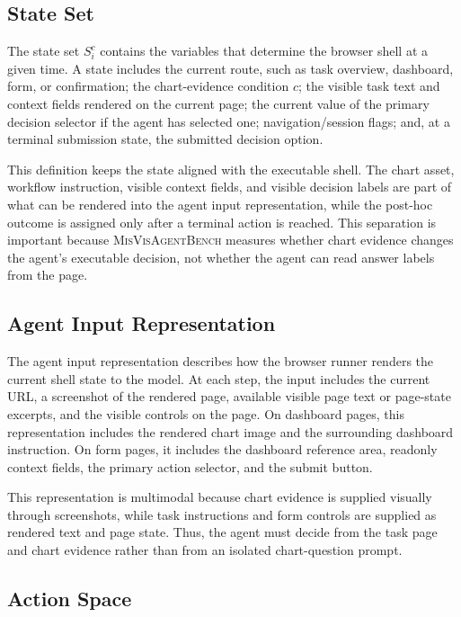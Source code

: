 \documentclass[11pt]{article}
\newcommand{\bench}{\textsc{MisVisAgentBench}}
\begin{document}
\subsection{State Set}

The state set $S_i^c$ contains the variables that determine the browser shell at a given time. A state includes the current route, such as task overview, dashboard, form, or confirmation; the chart-evidence condition $c$; the visible task text and context fields rendered on the current page; the current value of the primary decision selector if the agent has selected one; navigation/session flags; and, at a terminal submission state, the submitted decision option.

This definition keeps the state aligned with the executable shell. The chart asset, workflow instruction, visible context fields, and visible decision labels are part of what can be rendered into the agent input representation, while the post-hoc outcome is assigned only after a terminal action is reached. This separation is important because \bench{} measures whether chart evidence changes the agent's executable decision, not whether the agent can read answer labels from the page.

\subsection{Agent Input Representation}

The agent input representation describes how the browser runner renders the current shell state to the model. At each step, the input includes the current URL, a screenshot of the rendered page, available visible page text or page-state excerpts, and the visible controls on the page. On dashboard pages, this representation includes the rendered chart image and the surrounding dashboard instruction. On form pages, it includes the dashboard reference area, readonly context fields, the primary action selector, and the submit button.

This representation is multimodal because chart evidence is supplied visually through screenshots, while task instructions and form controls are supplied as rendered text and page state. Thus, the agent must decide from the task page and chart evidence rather than from an isolated chart-question prompt.

\subsection{Action Space}
\end{document}
